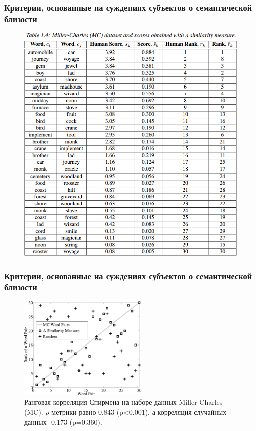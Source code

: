 \begin{frame}
\frametitle{Критерии, основанные на суждениях субъектов о семантической близости}

\begin{figure}
\includegraphics[height=0.6\textwidth]{./figures/rg}
\end{figure}


\end{frame}




\begin{frame}
\frametitle{Критерии, основанные на суждениях субъектов о семантической близости}

\begin{figure}
    \centering
        \includegraphics[width=0.55\textwidth]{../figures/mc-correlations-2}
    \caption{ Ранговая корреляция Спирмена на наборе данных Miller-Charles (MC). $\rho$ метрики равно 0.843 (p<0.001), а корреляция случайных данных -0.173 (p=0.360). }
    \label{fig:mc-correlations}
\end{figure}
\end{frame}


